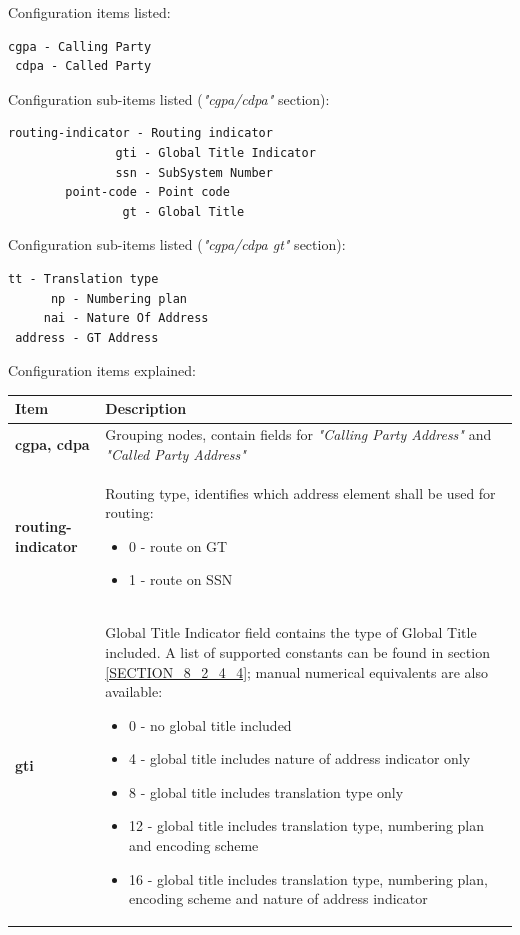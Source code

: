 \documentclass[a4paper,latin]{paper}
\begin{document}
\noindent{}Configuration items listed:
\begin{lstlisting}[style=BashInputStyle, belowskip=\baselineskip]
 cgpa - Calling Party
 cdpa - Called Party
\end{lstlisting}
\noindent{}Configuration sub-items listed (\textit{"cgpa/cdpa"} section):
\begin{lstlisting}[style=BashInputStyle, belowskip=\baselineskip]
 routing-indicator - Routing indicator
               gti - Global Title Indicator
               ssn - SubSystem Number
        point-code - Point code
                gt - Global Title
\end{lstlisting}
\noindent{}Configuration sub-items listed (\textit{"cgpa/cdpa gt"} section):
\begin{lstlisting}[style=BashInputStyle, belowskip=\baselineskip]
      tt - Translation type
      np - Numbering plan  
     nai - Nature Of Address
 address - GT Address
\end{lstlisting}
\noindent{}Configuration items explained:\\
\begin{tabularx}{\textwidth}{ | l | X |}
	\hline
	Item	 				& Description \\
	\hline
	\textbf{cgpa, cdpa}			& Grouping nodes, contain fields for \textit{"Calling Party Address"} and \textit{"Called Party Address"} \\ 
	\textbf{routing-indicator}		& Routing type, identifies which address element shall be used for routing: 
						  \begin{itemize} 
							\setlength{\itemsep}{0pt}
							\setlength{\parskip}{0pt}
							\setlength{\parsep}{0pt} 
							\item 0 - route on GT
							\item  1 - route on SSN
						  \end{itemize} \\
	\textbf{gti}				& Global Title Indicator field contains the type of Global Title included. A list of supported constants can be found in 
						  section \ref{SECTION_8_2_4_4}; manual numerical equivalents are also available:
						  \begin{itemize}
							\setlength{\itemsep}{0pt}
							\setlength{\parskip}{0pt}
							\setlength{\parsep}{0pt} 
							\item 0 - no global title included
							\item 4 - global title includes nature of address indicator only
							\item 8 - global title includes translation type only
							\item 12 - global title includes translation type, numbering plan and encoding scheme
							\item 16 - global title includes translation type, numbering plan, encoding scheme and nature of address indicator
						  \end{itemize} \\
	\hline
\end{tabularx}
\end{document}
